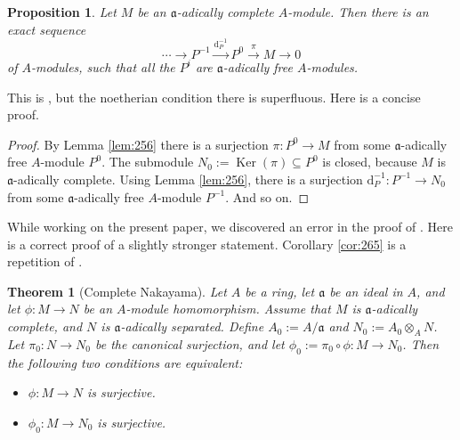 \documentclass[10pt]{amsart}
\newtheorem{thm}[equation]{Theorem}
\newtheorem{prop}[equation]{Proposition}
\theoremstyle{definition}
\numberwithin{equation}{section}
\newcommand{\xar}{\xrightarrow}
\newcommand{\sub}{\subseteq}
\newcommand{\opn}{\operatorname}
\newcommand{\rmitem}[1]{\item[\textrm{(#1)}]}
\newcommand{\mfrak}[1]{\mathfrak{#1}}
\renewcommand{\a}{\mfrak{a}}
\newcommand{\ot}{\otimes}
\renewcommand{\d}{\mathrm{d}}
\begin{document}
\begin{prop} \label{prop:145}
Let  $M$ be an $\a$-adically complete $A$-module. Then there is an exact
sequence
\[ \cdots \to P^{-1} \xar{\d^{-1}_P} P^0 \xar{\pi} M \to 0 \]
of $A$-modules, such that all the $P^i$ are
$\a$-adically free $A$-modules.
\end{prop}

This is \cite[Lemma 1.20]{PSY2}, but the noetherian condition there is
superfluous. Here is a concise proof.

\begin{proof}
By Lemma \ref{lem:256} there is a surjection
$\pi : P^0 \to M$ from some $\a$-adically free $A$-module $P^0$.
The submodule $N_0 := \opn{Ker}(\pi) \sub P^0$ is closed, because $M$ is
$\a$-adically complete. Using Lemma \ref{lem:256}, there is a surjection
$\d^{-1}_P : P^{-1} \to N_0$ from some $\a$-adically free $A$-module $P^{-1}$.
And so on.
\end{proof}

While working on the present paper, we discovered an error in the proof
of \cite[Theorem 2.11]{Ye1}. Here is a correct proof of a slightly stronger
statement. Corollary \ref{cor:265} is a repetition of
\cite[Theorem 2.11]{Ye1}.

\begin{thm}[Complete Nakayama] \label{thm:275}
Let $A$ be a ring, let $\a$ be an ideal in $A$,  and let
$\phi : M \to N$ be an $A$-module homomorphism.
Assume that $M$ is $\a$-adically complete, and $N$ is $\a$-adically separated.
Define $A_0 := A / \a$ and $N_0 := A_0 \ot_A N$.
Let $\pi_0 : N \to N_0$ be the canonical surjection,
and let $\phi_0 := \pi_0 \circ \phi : M \to N_0$.
Then the following two conditions are equivalent:
\begin{itemize}
\rmitem{i}  $\phi : M \to N$ is surjective.

\rmitem{ii}  $\phi_0 : M \to N_0$ is surjective.
\end{itemize}
\end{thm}
\end{document}
